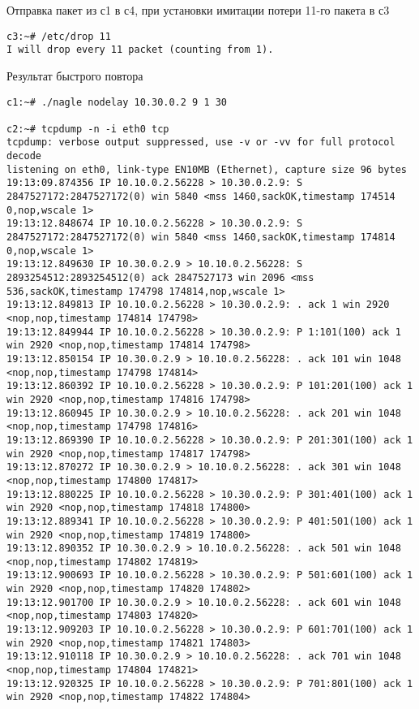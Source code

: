 \documentclass[a4paper,12pt]{article}
\begin{document}
Отправка пакет из с1 в с4, при установки имитации потери 11-го пакета в с3
\begin{lstlisting}
c3:~# /etc/drop 11
I will drop every 11 packet (counting from 1).
\end{lstlisting}

Результат быстрого повтора
\begin{lstlisting}
c1:~# ./nagle nodelay 10.30.0.2 9 1 30

c2:~# tcpdump -n -i eth0 tcp
tcpdump: verbose output suppressed, use -v or -vv for full protocol decode
listening on eth0, link-type EN10MB (Ethernet), capture size 96 bytes
19:13:09.874356 IP 10.10.0.2.56228 > 10.30.0.2.9: S 2847527172:2847527172(0) win 5840 <mss 1460,sackOK,timestamp 174514 0,nop,wscale 1>
19:13:12.848674 IP 10.10.0.2.56228 > 10.30.0.2.9: S 2847527172:2847527172(0) win 5840 <mss 1460,sackOK,timestamp 174814 0,nop,wscale 1>
19:13:12.849630 IP 10.30.0.2.9 > 10.10.0.2.56228: S 2893254512:2893254512(0) ack 2847527173 win 2096 <mss 536,sackOK,timestamp 174798 174814,nop,wscale 1>
19:13:12.849813 IP 10.10.0.2.56228 > 10.30.0.2.9: . ack 1 win 2920 <nop,nop,timestamp 174814 174798>
19:13:12.849944 IP 10.10.0.2.56228 > 10.30.0.2.9: P 1:101(100) ack 1 win 2920 <nop,nop,timestamp 174814 174798>
19:13:12.850154 IP 10.30.0.2.9 > 10.10.0.2.56228: . ack 101 win 1048 <nop,nop,timestamp 174798 174814>
19:13:12.860392 IP 10.10.0.2.56228 > 10.30.0.2.9: P 101:201(100) ack 1 win 2920 <nop,nop,timestamp 174816 174798>
19:13:12.860945 IP 10.30.0.2.9 > 10.10.0.2.56228: . ack 201 win 1048 <nop,nop,timestamp 174798 174816>
19:13:12.869390 IP 10.10.0.2.56228 > 10.30.0.2.9: P 201:301(100) ack 1 win 2920 <nop,nop,timestamp 174817 174798>
19:13:12.870272 IP 10.30.0.2.9 > 10.10.0.2.56228: . ack 301 win 1048 <nop,nop,timestamp 174800 174817>
19:13:12.880225 IP 10.10.0.2.56228 > 10.30.0.2.9: P 301:401(100) ack 1 win 2920 <nop,nop,timestamp 174818 174800>
19:13:12.889341 IP 10.10.0.2.56228 > 10.30.0.2.9: P 401:501(100) ack 1 win 2920 <nop,nop,timestamp 174819 174800>
19:13:12.890352 IP 10.30.0.2.9 > 10.10.0.2.56228: . ack 501 win 1048 <nop,nop,timestamp 174802 174819>
19:13:12.900693 IP 10.10.0.2.56228 > 10.30.0.2.9: P 501:601(100) ack 1 win 2920 <nop,nop,timestamp 174820 174802>
19:13:12.901700 IP 10.30.0.2.9 > 10.10.0.2.56228: . ack 601 win 1048 <nop,nop,timestamp 174803 174820>
19:13:12.909203 IP 10.10.0.2.56228 > 10.30.0.2.9: P 601:701(100) ack 1 win 2920 <nop,nop,timestamp 174821 174803>
19:13:12.910118 IP 10.30.0.2.9 > 10.10.0.2.56228: . ack 701 win 1048 <nop,nop,timestamp 174804 174821>
19:13:12.920325 IP 10.10.0.2.56228 > 10.30.0.2.9: P 701:801(100) ack 1 win 2920 <nop,nop,timestamp 174822 174804>

\end{lstlisting}
\end{document}
